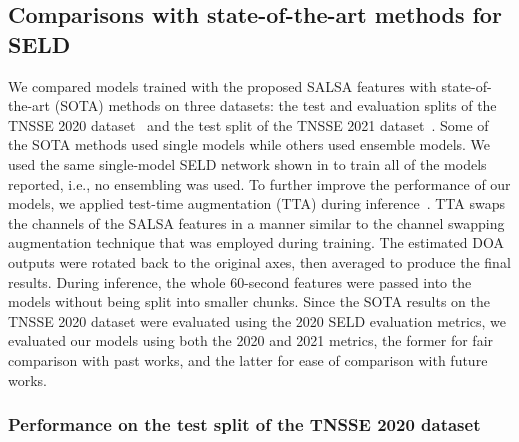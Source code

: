 \documentclass[journal]{IEEEtran}
\newcommand*{\ie}{i.e.,\xspace}
\begin{document}
\subsection{Comparisons with state-of-the-art methods for SELD}

We compared models trained with the proposed SALSA features with state-of-the-art (SOTA) methods on three datasets: the test and evaluation splits of the TNSSE 2020 dataset~\cite{Politis2020ADetection} and the test split of the TNSSE 2021 dataset~\cite{Politis2021}. Some of the SOTA methods used single models while others used ensemble models. We used the same single-model SELD network shown in  to train all of the models reported, \ie{} no ensembling was used. To further improve the performance of our models, we applied test-time augmentation (TTA) during inference~\cite{Shimada2021ACCDOA:Detection}. TTA swaps the channels of the SALSA features in a manner similar to the channel swapping augmentation technique that was employed during training. The estimated DOA outputs were rotated back to the original axes, then averaged to produce the final results. During inference, the whole \num{60}-second features were passed into the models without being split into smaller chunks. Since the SOTA results on the TNSSE 2020 dataset were evaluated using the 2020 SELD evaluation metrics, we evaluated our models using both the 2020 and 2021 metrics, the former for fair comparison with past works, and the latter for ease of comparison with future works.  

\subsubsection{Performance on the test split of the TNSSE 2020 dataset}
\end{document}
